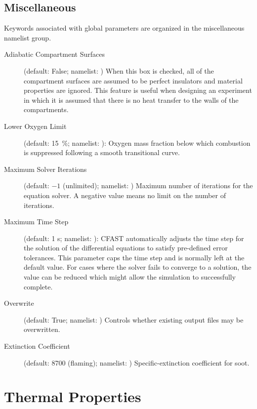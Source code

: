 \section{Miscellaneous}
\label{info:MISC}

Keywords associated with global parameters are organized in the miscellaneous namelist group.
\begin{description}
\item[Adiabatic Compartment Surfaces] (default: False; namelist: ) When this box is checked, all of the compartment surfaces are assumed to be perfect insulators and material properties are ignored. This feature is useful when designing an experiment in which it is assumed that there is no heat transfer to the walls of the compartments.

\item[Lower Oxygen Limit] (default: 15~\%; namelist: ):  Oxygen mass fraction below which combustion is suppressed following a smooth transitional curve.

\item[Maximum Solver Iterations] (default: $-1$ (unlimited); namelist: ) Maximum number of iterations for the equation solver. A negative value means no limit on the number of iterations. 

\item[Maximum Time Step] (default: 1 s; namelist: ): CFAST automatically adjusts the time step for the solution of the differential equations to satisfy pre-defined error tolerances. This parameter caps the time step and is normally left at the default value. For cases where the solver fails to converge to a solution, the value can be reduced which might allow the simulation to successfully complete.

\item[Overwrite] (default: True; namelist: ) Controls whether existing output files may be overwritten.

\item[Extinction Coefficient] (default: 8700 (flaming); namelist: ) Specific-extinction coefficient for soot.
\end{description}





\chapter{Thermal Properties}
\label{info:MATL}

